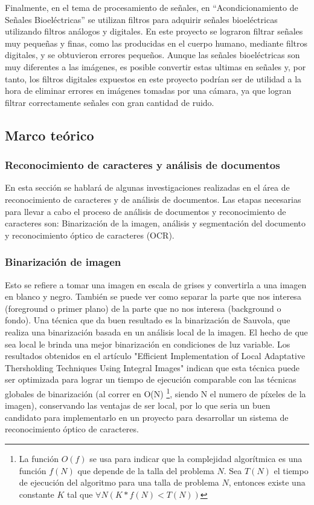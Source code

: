 \documentclass[a4paper, 11pt, oneside]{article}
\begin{document}
	Finalmente, en el tema de procesamiento de señales, en ``Acondicionamiento de Señales Bioeléctricas''
	se utilizan filtros para adquirir señales bioeléctricas utilizando filtros análogos y digitales.
	En este proyecto se lograron filtrar señales muy pequeñas y finas, como las producidas en el cuerpo humano, 
	mediante filtros digitales, y se obtuvieron errores pequeños.
	Aunque las señales bioeléctricas son muy diferentes a las imágenes, es posible 
    convertir estas ultimas en señales y, por tanto, los filtros digitales expuestos en este proyecto podrían 
    ser de utilidad a la hora de eliminar errores en imágenes tomadas por una cámara, ya que logran filtrar
	correctamente señales con gran cantidad de ruido.\newline
	
	\subsection {Marco teórico}
	\subsubsection{Reconocimiento de caracteres y análisis de documentos}
	En esta sección se hablará de algunas investigaciones realizadas en el área
	de reconocimiento de caracteres y de análisis de documentos.
	Las etapas necesarias para llevar a cabo el proceso de análisis de documentos
	y reconocimiento de caracteres son: Binarización de la imagen, análisis y
	segmentación del documento y reconocimiento óptico de caracteres (OCR).
	
	\subsubsection{Binarización de imagen}
	Esto se refiere a tomar una imagen en escala de grises y convertirla a una 
	imagen en blanco y negro. También se puede ver como separar la parte que nos interesa
	(foreground o primer plano) de la parte que no nos interesa (background o fondo).
	Una técnica que da buen resultado es la binarización de Sauvola,
	que realiza una binarización basada en un análisis local de la imagen. El hecho de
	que sea local le brinda una mejor binarización en condiciones de luz variable. Los 
    resultados obtenidos en el artículo "Efficient Implementation of Local Adaptative 
    Thersholding Techniques Using Integral Images" indican que esta técnica puede ser
    optimizada para lograr un tiempo de ejecución comparable con las técnicas globales de 
    binarización (al correr en O(N) \footnote{La función $O(f)$ se usa para indicar que la complejidad
    algorítmica es una función $f(N)$ que depende de la talla del problema $N$. Sea $T(N)$ el tiempo de 
    ejecución del algoritmo para una talla de problema $N$, entonces existe una constante $K$ tal que 
    $\forall N ( K*f(N) < T(N) ) $}, siendo N el numero de píxeles de la imagen),
    conservando	las ventajas de ser local, por lo que seria un buen candidato para implementarlo en un 
    proyecto para desarrollar un sistema de reconocimiento óptico de caracteres.
	
\end{document}
